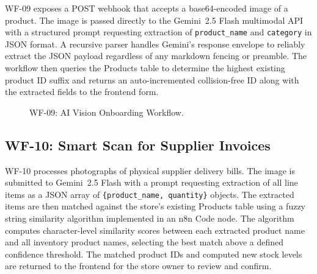 WF-09 exposes a POST webhook that accepts a base64-encoded image of a product. The image is
passed directly to the Gemini~2.5 Flash multimodal API with a structured prompt requesting
extraction of \texttt{product\_name} and \texttt{category} in JSON format. A recursive parser
handles Gemini's response envelope to reliably extract the JSON payload regardless of any
markdown fencing or preamble. The workflow then queries the Products table to determine the
highest existing product ID suffix and returns an auto-incremented collision-free ID along
with the extracted fields to the frontend form.

\begin{figure}[H]
\centering
{}
\caption{WF-09: AI Vision Onboarding Workflow.}
\label{fig:wf09}
\end{figure}

\subsection{WF-10: Smart Scan for Supplier Invoices}

WF-10 processes photographs of physical supplier delivery bills. The image is submitted to
Gemini~2.5 Flash with a prompt requesting extraction of all line items as a JSON array of
\texttt{\{product\_name, quantity\}} objects. The extracted items are then matched against
the store's existing Products table using a fuzzy string similarity algorithm implemented in
an n8n Code node. The algorithm computes character-level similarity scores between each
extracted product name and all inventory product names, selecting the best match above a
defined confidence threshold. The matched product IDs and computed new stock levels are
returned to the frontend for the store owner to review and confirm.

